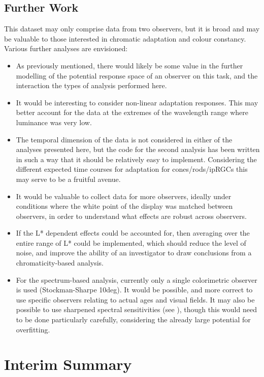 \subsection{Further Work}

This dataset may only comprise data from two observers, but it is broad and may be valuable to those interested in chromatic adaptation and colour constancy. Various further analyses are envisioned:
\begin{itemize}
    \item As previously mentioned, there would likely be some value in the further modelling of the potential response space of an observer on this task, and the interaction the types of analysis performed here.
    \item It would be interesting to consider non-linear adaptation responses. This may better account for the data at the extremes of the wavelength range where luminance was very low.
    \item The temporal dimension of the data is not considered in either of the analyses presented here, but the code for the second analysis has been written in such a way that it should be relatively easy to implement. Considering the different expected time courses for adaptation for cones/rods/\glspl{ipRGC} this may serve to be a fruitful avenue.
    \item It would be valuable to collect data for more observers, ideally under conditions where the white point of the display was matched between observers, in order to understand what effects are robust across observers.
    \item If the L* dependent effects could be accounted for, then averaging over the entire range of L* could be implemented, which should reduce the level of noise, and improve the ability of an investigator to draw conclusions from a chromaticity-based analysis.
    \item For the spectrum-based analysis, currently only a single colorimetric observer is used (Stockman-Sharpe 10deg). It would be possible, and more correct to use specific observers relating to actual ages and visual fields. It may also be possible to use sharpened spectral sensitivities (see \citet{finlayson_spectral_1994}), though this would need to be done particularly carefully, considering the already large potential for overfitting.
\end{itemize}

\section{Interim Summary}

